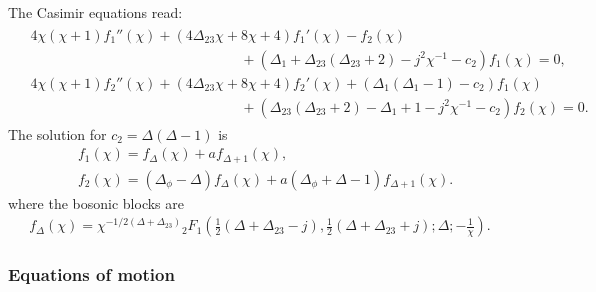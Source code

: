 \documentclass[letterpaper]{article}
\let\Oldsubsubsection\subsubsection
\renewcommand{\subsubsection}{\FloatBarrier\Oldsubsubsection}
\begin{document}
The Casimir equations read:
\begin{align}
\begin{split}
 & 4 \chi  (\chi +1) f_1''(\chi )
 +\left(4 \Delta _{23} \chi +8 \chi +4\right) f_1'(\chi )
 -f_2(\chi ) \\
 & \hspace{15em}
 + \left(\Delta _1+\Delta _{23} \left(\Delta _{23}+2\right) - j^2 \chi^{-1} - c_2\right) f_1(\chi )
 = 0, \\
 & 4 \chi  (\chi +1) f_2''(\chi ) 
 + \left(4 \Delta _{23} \chi +8 \chi +4\right) f_2'(\chi )
 + \left(\Delta _1 \left(\Delta _1-1\right) - c_2\right) f_1(\chi ) \\
 & \hspace{15em}
 + \left(\Delta _{23} \left(\Delta _{23}+2\right) -\Delta _1 + 1 - j^2 \chi^{-1} -c_2\right) f_2(\chi )
 = 0.
\end{split}
\end{align}
The solution for $c_2 = \Delta(\Delta-1)$ is
\begin{align}
 & f_1(\chi) = f_{\Delta}(\chi) + a f_{\Delta+1}(\chi), \\
 & f_2(\chi) 
   = (\Delta_\phi - \Delta) f_{\Delta}(\chi) 
   + a (\Delta_\phi + \Delta - 1) f_{\Delta+1}(\chi).
\end{align}
where the bosonic blocks are
\begin{align}
 f_{\Delta}(\chi) 
 = \chi^{-1/2(\Delta + \Delta_{23})} {}_2F_1 \left( 
    \frac{1}{2}(\Delta + \Delta_{23} - j),
    \frac{1}{2}(\Delta + \Delta_{23} + j);
    \Delta;
    -\frac{1}{\chi}
   \right).
\end{align}

\subsubsection{Equations of motion}
\end{document}
